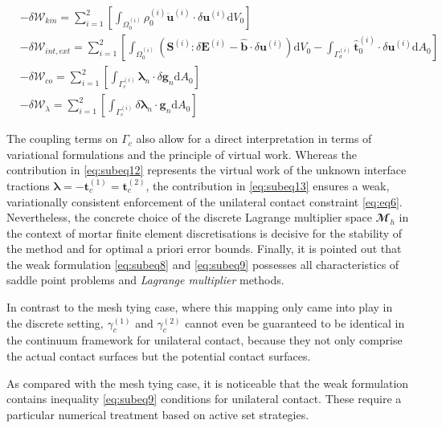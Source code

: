\documentclass[a4paper,10pt]{article} %
\begin{document}
\begin{subequations}\label{eq:constributions}
 \begin{align}
  & -\delta \mathcal{W}_{kin} = \sum_{i = 1}^2 \left[\int_{\Omega_0^{(i)}} \rho_0^{(i)} \ddot{\mathbf{u}}^{(i)} \cdot \delta \mathbf{u}^{(i)} \text{d}V_0\right] \label{eq:subeq10} \\
 & -\delta \mathcal{W}_{int,ext} = \sum_{i = 1}^2 \left[\int_{\Omega_0^{(i)}} \left(\mathbf{S}^{(i)} : \delta \mathbf{E}^{(i)} - \hat{\mathbf{b}}\cdot \delta\mathbf{u}^{(i)} \right) \text{d}V_0 - \int_{\Gamma_\sigma^{(i)}} \hat{\mathbf{t}}_0^{(i)}\cdot\delta\mathbf{u}^{(i)} \text{d}A_0 \right] \label{eq:subeq11} \\
 & -\delta \mathcal{W}_{co} = \sum_{i = 1}^2 \left[\int_{\Gamma_c^{(i)}} \boldsymbol{\lambda}_n \cdot \delta\mathbf{g}_n \text{d}A_0\right] \label{eq:subeq12} \\ 
 & -\delta \mathcal{W}_{\lambda} = \sum_{i = 1}^2 \left[\int_{\Gamma_c^{(i)}} \delta \boldsymbol{\lambda}_n \cdot \mathbf{g}_n \text{d}A_0\right] \label{eq:subeq13}
 \end{align}
\end{subequations}

The coupling terms on $\Gamma_c$ also allow for a direct interpretation in terms of variational formulations and the principle of virtual work. Whereas the contribution in \eqref{eq:subeq12} represents the virtual work of the unknown interface tractions $\boldsymbol{\lambda} = −\mathbf{t}_c^{(1)} = \mathbf{t}_c^{(2)}$, the contribution in \eqref{eq:subeq13} ensures a weak, variationally consistent enforcement of the unilateral contact constraint \eqref{eq:eq6}. Nevertheless, the concrete choice of the discrete Lagrange multiplier space $\mathbfcal{M}_h$ in the context of mortar finite element discretisations is decisive for the stability of the method and for optimal a priori error bounds. Finally, it is pointed out that the weak formulation \eqref{eq:subeq8} and \eqref{eq:subeq9} possesses all characteristics of saddle point problems and \textit{Lagrange multiplier} methods.

In contrast to the mesh tying case, where this mapping only came into play in the discrete setting, $\gamma_c^{(1)}$ and $\gamma_c^{(2)}$ cannot even be guaranteed to be identical in the continuum framework for unilateral contact, because they not only comprise the actual contact surfaces but the potential contact surfaces. 

As compared with the mesh tying case, it is noticeable that the weak formulation contains inequality \eqref{eq:subeq9} conditions for unilateral contact. These require a particular numerical treatment based on active set strategies.
\end{document}
